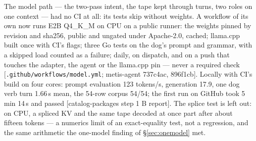 \documentclass[11pt]{article}
\newcommand{\src}[1]{{\footnotesize\textsf{[#1]}}}
\begin{document}
The model path --- the two-pass intent, the tape kept through turns, two roles on one
context --- had no CI at all: its tests skip without weights. A workflow of its own now
runs E2B Q4\_K\_M on CPU on a public runner: the weights pinned by revision and sha256,
public and ungated under Apache-2.0, cached; llama.cpp built once with CI's flags; three Go
tests on the dog's prompt and grammar, with a skipped load counted as a failure; daily, on
dispatch, and on a push that touches the adapter, the agent or the llama.cpp pin --- never a
required check \src{\texttt{.github/workflows/model.yml}; metis-agent 737c4ac, 896f1cb}.
Locally with CI's build on four cores: prompt evaluation 123 tokens/s, generation 17.9, one
dog verb turn 1.66\,s mean, the 54-row corpus 54/54; the first run on GitHub took 5\,min
14\,s and passed \src{catalog-packages step 1 B report}. The splice test is left out: on
CPU, a spliced KV and the same tape decoded at once part after about fifteen tokens --- a
numerics limit of an exact-equality test, not a regression, and the same arithmetic the
one-model finding of \S\ref{sec:onemodel} met.
\end{document}
